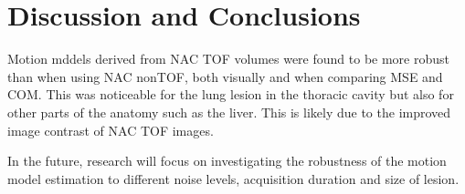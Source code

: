 \documentclass{IEEEtran}
\begin{document}
\vspace{-0.2cm}

\section{Discussion and Conclusions}
Motion mddels derived from NAC TOF volumes were found to be more robust than when using NAC nonTOF, both visually and when comparing MSE and COM. This was noticeable for the lung lesion in the thoracic cavity but also for other parts of the anatomy such as the liver. This is likely due to the improved image contrast of NAC TOF images.

In the future, research will focus on investigating the robustness of the motion model estimation to different noise levels, acquisition duration and size of lesion.

\vspace{-0.2cm}
\AtNextBibliography{\small}
\printbibliography
\vspace{-0.2cm}
\end{document}
